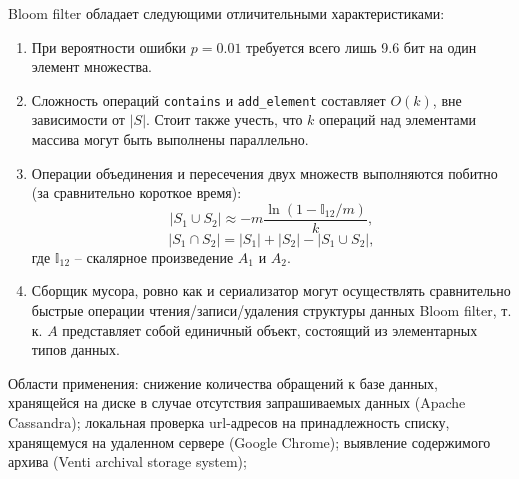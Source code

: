 \begin{remark}
Bloom filter  обладает следующими отличительными характеристиками:
\begin{enumerate}
\item При вероятности ошибки $p = 0.01$ требуется всего лишь 9.6 бит на один элемент множества.
\item  Сложность операций \verb|contains| и \verb|add_element| составляет $O(k)$, вне зависимости от $|S|$. Стоит также учесть, что $k$ операций над элементами массива могут быть выполнены параллельно. 
\item Операции объединения и пересечения двух множеств выполняются побитно (за сравнительно короткое время): 
\[
 |S_1 \cup S_2| \approx  - m \frac{\ln (1 - \mathbb{I}_{12}/m)}{k},
 \]   
 \[
 |S_1 \cap S_2| = |S_1| + |S_2| -   |S_1 \cup S_2|,
 \]
где $\mathbb{I}_{12}$ -- скалярное произведение  $A_1 $ и $A_2$. 

\item Сборщик мусора, ровно как и сериализатор могут осуществлять сравнительно быстрые операции чтения/записи/удаления структуры данных Bloom filter, т. к.  $A$ представляет собой единичный объект, состоящий из элементарных типов данных.
\end{enumerate}

Области применения: снижение количества обращений к базе данных, хранящейся на диске в случае отсутствия запрашиваемых данных (Apache Cassandra);  локальная проверка url-адресов на принадлежность списку, хранящемуся на удаленном сервере (Google Chrome); 
выявление содержимого архива (Venti archival storage system);  
\end{remark}

